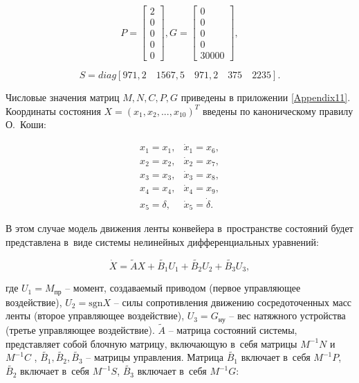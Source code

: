 $$
 P = 
\begin{bmatrix}
	2                                \\
	0                                \\
	0                                \\
	0                                \\
	0
\end{bmatrix}, G = 
\begin{bmatrix}
	0                                \\
	0                                \\
	0                                \\
	0                                \\
	30000
\end{bmatrix},
$$

$$ S = diag [ 971,2 \quad 1567,5 \quad 971,2 \quad 375 \quad 2235]. $$
\fi

Числовые значения матриц $ M, N, C, P, G $ приведены в приложении \ref{Appendix11}.\\

Координаты состояния $X = (x_1, x_2, ..., x_10)^T$ введены по каноническому правилу О.~Коши:

$$ 
\begin{matrix}
x_1 = x_1,    & \dot x_1 = x_6,      \\
x_2 = x_2,    & \dot x_2 = x_7,      \\
x_3 = x_3,    & \dot x_3 = x_8,      \\
x_4 = x_4,    & \dot x_4 = x_9,      \\
x_5 = \delta, & \dot x_5 = \dot \delta.
\end{matrix}
$$

В этом случае модель движения ленты конвейера в~пространстве состояний будет представлена в~виде системы нелинейных дифференциальных уравнений:

$$ \dot X =  \tilde{A} X + \tilde{B_1}U_1 + \tilde{B_2} U_2 + \tilde{B_3} U_3, $$

где $ U_1 = M_{\text{пр}} $ -- момент, создаваемый приводом (первое управляющее воздействие), $ U_2 = \text{sgn}X $ -- силы сопротивления движению сосредоточенных масс ленты (второе управляющее воздействие), $ U_3 = G_{\text{ну}} $ -- вес натяжного устройства (третье управляющее воздействие).
$ \tilde{A} $ -- матрица состояний системы, представляет собой блочную матрицу, включающую в~себя матрицы $ M^{-1} N $ и~$ M^{-1} C $ ,  $ \tilde{B_1}, \tilde{B_2}, \tilde{B_3} $ -- матрицы управления. Матрица $ \tilde{B_1} $ включает в~себя $ M^{-1} P $, $\tilde{B_2}$ включает в~себя $ M^{-1} S $, $ \tilde{B_3} $ включает в~себя $ M^{-1} G $:

